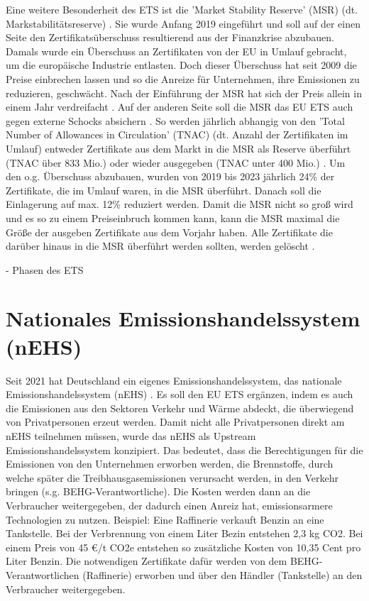 Eine weitere Besonderheit des ETS ist die 'Market Stability Reserve' (MSR) (dt. Markstabilitätsreserve) \cite{eu3.2023}. Sie wurde Anfang 2019 eingeführt und soll auf der einen Seite den Zertifikatsüberschuss resultierend aus der Finanzkrise abzubauen. 
Damals wurde ein Überschuss an Zertifikaten von der EU in Umlauf gebracht, um die europäische Industrie entlasten. 
Doch dieser Überschuss hat seit 2009 die Preise einbrechen lassen und so die Anreize für Unternehmen, ihre Emissionen zu reduzieren, geschwächt. Nach der Einführung der MSR hat sich der Preis allein in einem Jahr verdreifacht .
Auf der anderen Seite soll die MSR das EU ETS auch gegen externe Schocks absichern \cite{eu3.2023}. 
So werden jährlich abhangig von den 'Total Number of Allowances in Circulation' (TNAC) (dt. Anzahl der Zertifikaten im Umlauf) entweder Zertifikate aus dem Markt in die MSR als Reserve überführt (TNAC über 833 Mio.) oder wieder ausgegeben (TNAC unter 400 Mio.) \cite[S. 7]{icap2.2023}. 
Um den o.g. Überschuss abzubauen, wurden von 2019 bis 2023 jährlich 24\% der Zertifikate, die im Umlauf waren, in die MSR überführt. 
Danach soll die Einlagerung auf max. 12\% reduziert werden.
Damit die MSR nicht so groß wird und es so zu einem Preiseinbruch kommen kann, kann die MSR maximal die Größe der ausgeben Zertifikate aus dem Vorjahr haben. 
Alle Zertifikate die darüber hinaus in die MSR überführt werden sollten, werden gelöscht \cite{eu3.2023}. 

- Phasen des ETS

\section{Nationales Emissionshandelssystem (nEHS)}

Seit 2021 hat Deutschland ein eigenes Emissionshandelssystem, das nationale Emissionshandelssystem (nEHS) \cite{dehst.2023}. Es soll den EU ETS ergänzen, indem es auch die Emissionen aus den Sektoren Verkehr und Wärme abdeckt, die überwiegend von Privatpersonen erzeut werden. 
Damit nicht alle Privatpersonen direkt am nEHS teilnehmen müssen, wurde das nEHS als Upstream Emissionshandelssystem konzipiert. 
Das bedeutet, dass die Berechtigungen für die Emissionen von den Unternehmen erworben werden, die Brennstoffe, durch welche später die Treibhausgasemissionen verursacht werden, in den Verkehr bringen (s.g. BEHG-Verantwortliche). 
Die Kosten werden dann an die Verbraucher weitergegeben, der dadurch einen Anreiz hat, emissionsarmere Technologien zu nutzen. Beispiel: Eine Raffinerie verkauft Benzin an eine Tankstelle. 
Bei der Verbrennung von einem Liter Bezin entstehen 2,3 kg CO2. Bei einem Preis von 45 €/t CO2e entstehen so zusätzliche Kosten von 10,35 Cent pro Liter Benzin. 
Die notwendigen Zertifikate dafür werden von dem BEHG-Verantwortlichen (Raffinerie) erworben und über den Händler (Tankstelle) an den Verbraucher weitergegeben.

